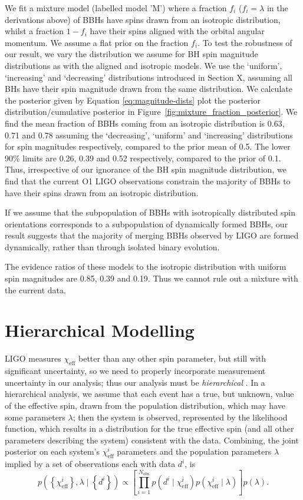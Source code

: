 \documentclass[modern,linenumbers]{aastex61}
\newcommand{\chieff}{\chi_\mathrm{eff}}
\begin{document}
We fit a mixture model (labelled model 'M') where a fraction $f_i$ ($f_i=\lambda$ in the derivations above) of BBHs have spins drawn from an isotropic distribution, whilst a fraction $1 - f_i$ have their spins aligned with the orbital angular momentum. We assume a flat prior on the fraction $f_i$. To test the robustness of our result, we vary the distribution we assume for BH spin magnitude distributions as with the aligned and isotropic models. We use the `uniform', `increasing' and `decreasing' distributions introduced in Section X, assuming all BHs have their spin magnitude drawn from the same distribution. We calculate the posterior given by Equation \ref{eq:magnitude-dists} plot the posterior distribution/cumulative posterior in Figure~\ref{fig:mixture_fraction_posterior}. We find the mean fraction of BBHs coming from an isotropic distribution is 0.63, 0.71 and 0.78 assuming the `decreasing', `uniform' and `increasing' distributions for spin magnitudes respectively, compared to the prior mean of 0.5. The lower 90\% limits are 0.26, 0.39 and 0.52 respectively, compared to the prior of 0.1. Thus, irrespective of our ignorance of the BH spin magnitude distribution, we find that the current O1 LIGO observations constrain the majority of BBHs to have their spins drawn from an isotropic distribution. 

If we assume that the subpopulation of BBHs with isotropically distributed spin orientations corresponds to a subpopulation of dynamically formed BBHs, our result suggests that the majority of merging BBHs observed by LIGO are formed dynamically, rather than through isolated binary evolution.

The evidence ratios of these models to the isotropic distribution with uniform spin magnitudes are 0.85, 0.39 and 0.19. Thus we cannot rule out a mixture with the current data. 


\section{Hierarchical Modelling} 
\label{sec:hierarchical}

LIGO measures $\chieff$ better than any other spin parameter, but
still with significant uncertainty, so we need to properly incorporate
measurement uncertainty in our analysis; thus our analysis must be
\emph{hierarchical} \citep{2010ApJ...725.2166H,2010PhRvD..81h4029M}.
In a hierarchical analysis, we assume that each event has a true, but
unknown, value of the effective spin, drawn from the population
distribution, which may have some parameters $\lambda$; then the
system is observed, represented by the likelihood function, which
results in a distribution for the true effective spin (and all other
parameters describing the system) consistent with the data.
Combining, the joint posterior on each system's $\chieff^i$ parameters
and the population parameters $\lambda$ implied by a set of
observations each with data $d^i$, is
\begin{equation}
  p\left( \left\{ \chieff^i \right\}, \lambda \mid \left\{ d^i \right\} \right) \propto \left[ \prod_{i=1}^{N_\mathrm{obs}} p\left(d^i \mid \chieff^i \right) p\left( \chieff^i \mid \lambda \right) \right] p\left(\lambda\right).
\end{equation}
\end{document}
